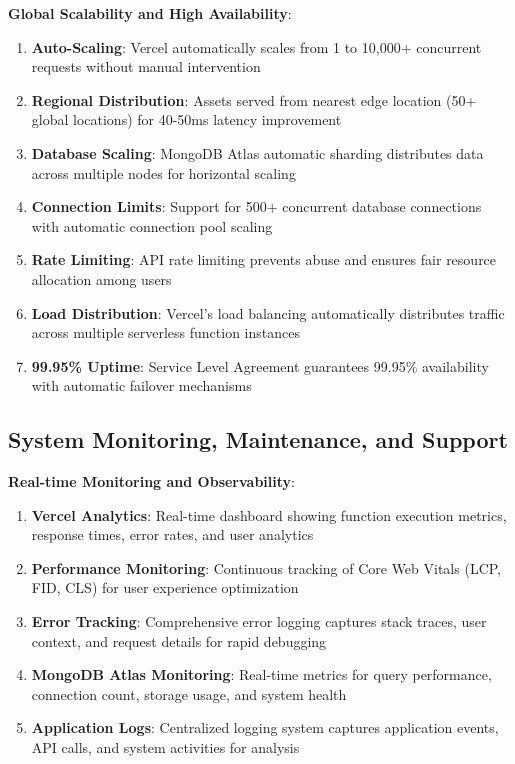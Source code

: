 \documentclass[12pt,a4paper]{report}
\begin{document}
\textbf{Global Scalability and High Availability}:
\begin{enumerate}[label=\roman*)]
    \item \textbf{Auto-Scaling}: Vercel automatically scales from 1 to 10,000+ concurrent requests without manual intervention
    \item \textbf{Regional Distribution}: Assets served from nearest edge location (50+ global locations) for 40-50ms latency improvement
    \item \textbf{Database Scaling}: MongoDB Atlas automatic sharding distributes data across multiple nodes for horizontal scaling
    \item \textbf{Connection Limits}: Support for 500+ concurrent database connections with automatic connection pool scaling
    \item \textbf{Rate Limiting}: API rate limiting prevents abuse and ensures fair resource allocation among users
    \item \textbf{Load Distribution}: Vercel's load balancing automatically distributes traffic across multiple serverless function instances
    \item \textbf{99.95\% Uptime}: Service Level Agreement guarantees 99.95\% availability with automatic failover mechanisms
\end{enumerate}

\subsection{System Monitoring, Maintenance, and Support}

\textbf{Real-time Monitoring and Observability}:
\begin{enumerate}[label=\roman*)]
    \item \textbf{Vercel Analytics}: Real-time dashboard showing function execution metrics, response times, error rates, and user analytics
    \item \textbf{Performance Monitoring}: Continuous tracking of Core Web Vitals (LCP, FID, CLS) for user experience optimization
    \item \textbf{Error Tracking}: Comprehensive error logging captures stack traces, user context, and request details for rapid debugging
    \item \textbf{MongoDB Atlas Monitoring}: Real-time metrics for query performance, connection count, storage usage, and system health
    \item \textbf{Application Logs}: Centralized logging system captures application events, API calls, and system activities for analysis
\end{enumerate}
\end{document}
